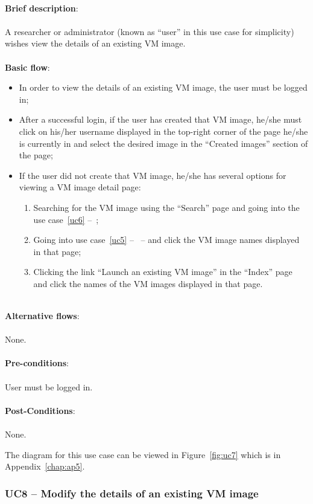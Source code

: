 \ \\
\textbf{Brief description}:\\
\ \\
A researcher or administrator (known as ``user'' in this use case for simplicity) wishes view the details of an existing VM image.\\
\ \\
\textbf{Basic flow}:

\begin{itemize}
\item In order to view the details of an existing VM image, the user must be logged in;
\item After a successful login,  if the user has created that VM image, he/she must click on his/her username displayed in the top-right corner of the page he/she is currently in and select the desired image in the ``Created images'' section of the page;
\item If the user did not create that VM image, he/she has several options for viewing a VM image detail page:
	\begin{enumerate}
	\item Searching for the VM image using the ``Search'' page and going into the use case~\ref{uc6} --~;
	\item Going into use case~\ref{uc5} --~ -- and click the VM image names displayed in that page;
	\item Clicking the link ``Launch an existing VM image'' in the ``Index'' page and click the names of the VM images displayed in that page.
	\end{enumerate}
\end{itemize}

\ \\
\textbf{Alternative flows}:\\
\ \\
None.\\
\ \\
\textbf{Pre-conditions}:\\
\ \\
User must be logged in.\\
\ \\
\textbf{Post-Conditions}:\\
\ \\
None.

The diagram for this use case can be viewed in Figure~\ref{fig:uc7} which is in Appendix~\ref{chap:ap5}.

\subsubsection{UC8 -- Modify the details of an existing VM image}\label{uc8}


